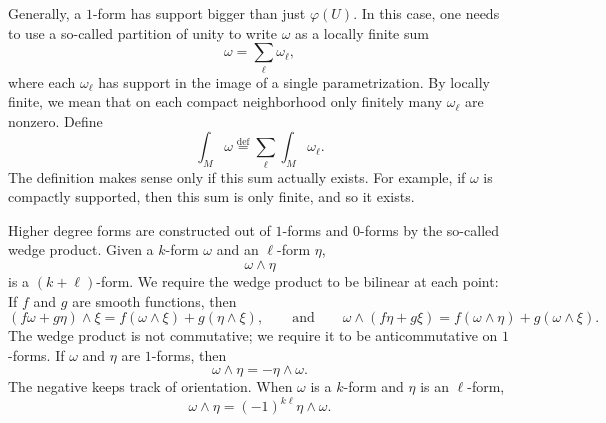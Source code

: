 \documentclass[12pt,openany]{book}
\theoremstyle{plain}
\theoremstyle{remark}
\theoremstyle{definition}
\theoremstyle{exercise}
\theoremstyle{example}
\begin{document}
Generally, a $1$-form has support bigger than just $\varphi(U)$.  In this
case, one needs to use a so-called partition of unity to write $\omega$
as a locally finite sum
\begin{equation*}
\omega = \sum_{\ell} \omega_\ell ,
\end{equation*}
where each $\omega_\ell$ has support in the image of a single
parametrization.  By locally finite, we mean that on each compact
neighborhood only finitely many $\omega_\ell$ are nonzero.  
Define
\begin{equation*}
\int_M \omega
\overset{\text{def}}{=}
\sum_{\ell}
\int_M \omega_\ell .
\end{equation*}
The definition makes sense only
if this sum actually exists.  For example, if $\omega$ is
compactly supported, then this sum is only finite, and so it exists.

Higher degree forms are constructed out of $1$-forms and $0$-forms
by the so-called wedge product.  Given a $k$-form $\omega$
and an $\ell$-form $\eta$,
%
\begin{equation*}
\omega \wedge \eta
\end{equation*}
is a $(k+\ell)$-form.  We require the wedge product to be bilinear at each point:
If $f$ and $g$ are smooth functions, then
\begin{equation*}
(f \omega + g \eta) \wedge \xi =
f (\omega \wedge \xi) + g (\eta \wedge \xi)
, \qquad
\text{and}
\qquad
\omega \wedge (f \eta + g \xi) = 
f (\omega \wedge \eta ) +
g ( \omega \wedge \xi) . 
\end{equation*}
The wedge product is not commutative; we require it to be 
anticommutative on $1$-forms. If $\omega$ and $\eta$ are $1$-forms,
then
\begin{equation*}
\omega \wedge \eta = - \eta \wedge \omega .
\end{equation*}
The negative keeps track of orientation.
When $\omega$ is a $k$-form and $\eta$ is an $\ell$-form, 
\begin{equation*}
\omega \wedge \eta = {(-1)}^{k\ell} \eta \wedge \omega .
\end{equation*}
\end{document}
